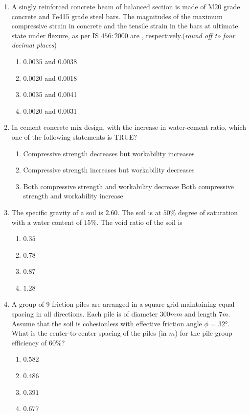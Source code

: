 \documentclass{exam}
\begin{document}
\begin{enumerate}
\item A singly reinforced concrete beam of balanced section is made of M20 grade concrete and Fe415 grade steel bars. The magnitudes of the maximum compressive strain in concrete and the tensile strain in the bars at ultimate state under flexure, as per IS $456: 2000$ are \underline{\hspace{2cm}}, respectively.(\textit{round off to four decimal places})
\begin{enumerate}
    \item 0.0035 and 0.0038
    \item 0.0020 and 0.0018
    \item 0.0035 and 0.0041
    \item 0.0020 and 0.0031
\end{enumerate}
\vspace{0.5cm}

\item In cement concrete mix design, with the increase in water-cement ratio, which one of the following statements is TRUE?
\begin{enumerate}
    \item Compressive strength decreases but workability increases
    \item Compressive strength increases but workability decreases
    \item Both compressive strength and workability decrease
    \ite Both compressive strength and workability increase
\end{enumerate}
\vspace{0.5cm}

\item The specific gravity of a soil is $2.60$. The soil is at $50\%$ degree of saturation with a water content of $15\%$. The void ratio of the soil is \underline{\hspace{2cm}}
\begin{enumerate}
    \item $0.35$
    \item $0.78$
    \item $0.87$
    \item $1.28$
\end{enumerate}
\vspace{0.5cm}

\item A group of 9 friction piles are arranged in a square grid maintaining equal spacing in all directions. Each pile is of diameter $300 mm$ and length $7 m$. Assume that the soil is cohesionless with effective friction angle $\phi$ = 32°. What is the center-to-center spacing of the piles (in $m$) for the pile group efficiency of $60\%$?
\begin{enumerate}
    \item $0.582$
    \item $0.486$
    \item $0.391$
    \item $0.677$
\end{enumerate}


\end{enumerate}
\end{document}
